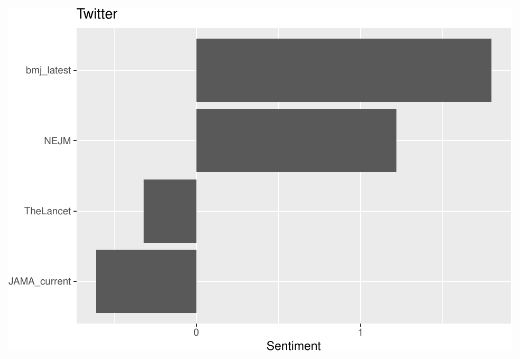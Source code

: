 \documentclass[]{article}
\begin{document}
\includegraphics{nlp_tw_files/figure-latex/unnamed-chunk-4-1.pdf}
\end{document}

